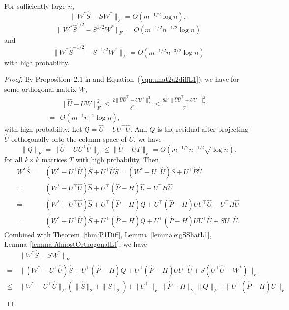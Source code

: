 \begin{lemma}
\label{lemma:exchangeL1}
For sufficiently large $n$,
\[
	\| W^* \hat{S} - S W^* \|_F = O(m^{-1/2} \log n),
\]
\[
	\|W^* \hat{S}^{1/2} - S^{1/2} W^* \|_F = O(m^{-1/2} n^{-1/2} \log n)
\]
and
\[
	\| W^* \hat{S}^{-1/2} - S^{-1/2} W^* \|_F = O(m^{-1/2} n^{-3/2} \log n)
\]
with high probability.
\end{lemma}
\begin{proof}
By Proposition~2.1 in \citep{rohe2011spectral} and Equation~(\ref{eqn:uhat2u2diffL1}), we have for some orthogonal matrix $W$, 
\begin{align*}
& \|\hat{U} - U W\|_F^2 \le \frac{2 \|\hat{U} \hat{U}^{\top} - U U^{\top}\|_F^2}{\delta^2}
\le \frac{8 k^2 \|\hat{U} \hat{U}^{\top} - U U^{\top}\|_2^2}{\delta^2} \\
= & O(m^{-1} n^{-1} \log n),
\end{align*}
with high probability.
Let $Q = \hat{U} - U U^{\top} \hat{U}$. And $Q$ is the residual after projecting $\hat{U}$ orthogonally onto the column space of $U$, we have
\begin{equation}
\label{eqn:QFnormL1}
\| Q \|_F = \| \hat{U} - U U^{\top} \hat{U} \|_F \le \| \hat{U} - U T \|_F = O(m^{-1/2} n^{-1/2} \sqrt{\log n}).
\end{equation}
for all $k \times k$ matrices $T$ with high probability. 
Then
\begin{align*}
	W^* \hat{S} = & (W^* - U^{\top} \hat{U}) \hat{S} + U^{\top} \hat{U} \hat{S}
    = (W^* - U^{\top} \hat{U}) \hat{S} + U^{\top} \hat{P} \hat{U} \\
    = & (W^* - U^{\top} \hat{U}) \hat{S} + U^{\top} (\hat{P} - H) \hat{U} + U^{\top} H \hat{U} \\
    = & (W^* - U^{\top} \hat{U}) \hat{S} + U^{\top} (\hat{P} - H) Q + U^{\top} (\hat{P} - H) U U^{\top} \hat{U} + U^{\top} H \hat{U} \\
    = & (W^* - U^{\top} \hat{U}) \hat{S} + U^{\top} (\hat{P} - H) Q + U^{\top} (\hat{P} - H) U U^{\top} \hat{U} + S U^{\top} \hat{U}.
\end{align*}
Combined with Theorem~\ref{thm:P1Diff}, Lemma~\ref{lemma:eigSShatL1}, Lemma~\ref{lemma:AlmostOrthogonalL1}, we have
\begin{align*}
	& \| W^* \hat{S} - S W^* \|_F \\
    = & \| (W^* - U^{\top} \hat{U}) \hat{S} + U^{\top} (\hat{P} - H) Q + U^{\top} (\hat{P} - H) U U^{\top} \hat{U} + S (U^{\top} \hat{U} - W^*)\|_F \\
    \le & \| W^* - U^{\top} \hat{U} \|_F (\| \hat{S} \|_2 + \| S \|_2) + \| U^{\top} \|_F \| \hat{P} - H\|_2 \| Q \|_F + \| U^{\top} (\hat{P} - H) U \|_F \\

\end{align*}
\end{proof}
